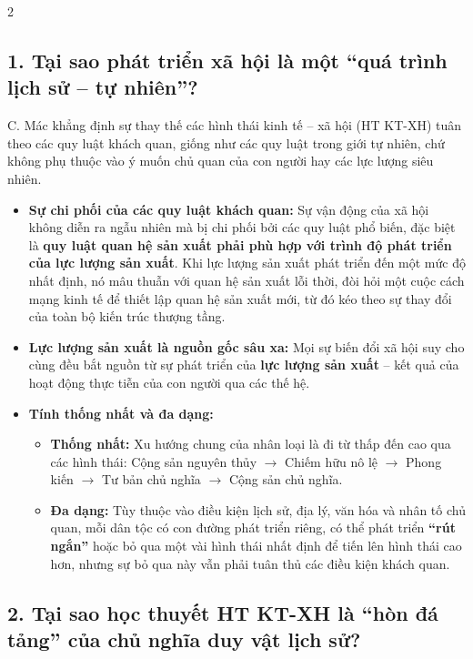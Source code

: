 \documentclass[9pt,a4paper]{extarticle}
\begin{document}
\begin{multicols*}{2}
\subsection*{1. Tại sao phát triển xã hội là một ``quá trình lịch sử -- tự nhiên''?}

C. Mác khẳng định sự thay thế các hình thái kinh tế -- xã hội (HT KT-XH) tuân theo các quy luật khách quan, giống như các quy luật trong giới tự nhiên, chứ không phụ thuộc vào ý muốn chủ quan của con người hay các lực lượng siêu nhiên.

\begin{itemize}
\item \textbf{Sự chi phối của các quy luật khách quan:} Sự vận động của xã hội không diễn ra ngẫu nhiên mà bị chi phối bởi các quy luật phổ biến, đặc biệt là \textbf{quy luật quan hệ sản xuất phải phù hợp với trình độ phát triển của lực lượng sản xuất}. Khi lực lượng sản xuất phát triển đến một mức độ nhất định, nó mâu thuẫn với quan hệ sản xuất lỗi thời, đòi hỏi một cuộc cách mạng kinh tế để thiết lập quan hệ sản xuất mới, từ đó kéo theo sự thay đổi của toàn bộ kiến trúc thượng tầng.
\item \textbf{Lực lượng sản xuất là nguồn gốc sâu xa:} Mọi sự biến đổi xã hội suy cho cùng đều bắt nguồn từ sự phát triển của \textbf{lực lượng sản xuất} -- kết quả của hoạt động thực tiễn của con người qua các thế hệ.
\item \textbf{Tính thống nhất và đa dạng:}
  \begin{itemize}
  \item \textbf{Thống nhất:} Xu hướng chung của nhân loại là đi từ thấp đến cao qua các hình thái: Cộng sản nguyên thủy $\rightarrow$ Chiếm hữu nô lệ $\rightarrow$ Phong kiến $\rightarrow$ Tư bản chủ nghĩa $\rightarrow$ Cộng sản chủ nghĩa.
  \item \textbf{Đa dạng:} Tùy thuộc vào điều kiện lịch sử, địa lý, văn hóa và nhân tố chủ quan, mỗi dân tộc có con đường phát triển riêng, có thể phát triển \textbf{``rút ngắn''} hoặc bỏ qua một vài hình thái nhất định để tiến lên hình thái cao hơn, nhưng sự bỏ qua này vẫn phải tuân thủ các điều kiện khách quan.
  \end{itemize}
\end{itemize}

\subsection*{2. Tại sao học thuyết HT KT-XH là ``hòn đá tảng'' của chủ nghĩa duy vật lịch sử?}


\end{multicols*}
\end{document}
